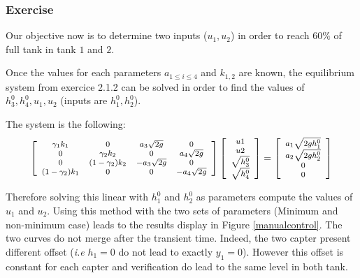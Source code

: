 \subsubsection{Exercise}

Our objective now is to determine two inputs ($u_1, u_2$) in order to reach $60\%$ of full tank in tank $1$ and $2$.

Once the values for each parameters $a_{1 \leq i \leq 4}$ and $k_{1,2}$ are known, the equilibrium system from exercice 2.1.2 can be solved in order to find the values of $h_3^0,h_4^0,u_1,u_2$ (inputs are $h_1^0,h_2^0$).  

The system is the following:
$$
    \footnotesize
\left[
    \begin{array}{cccc}
        \gamma_1 k_1 & 0 & a_3 \sqrt{2g} & 0 \\
        0 & \gamma_2 k_2 & 0 & a_4 \sqrt{2g} \\
        0 & (1-\gamma_2) k_2 & -a_3 \sqrt{2g} & 0 \\
        (1-\gamma_2) k_1 & 0 & 0 & -a_4 \sqrt{2g} \\
    \end{array}
\right]
\left[
    \begin{array}{c}
        u1 \\ u2 \\ \sqrt{h_3^0} \\ \sqrt{h_4^0}
    \end{array}
\right]
=
\left[
    \begin{array}{c}
        a_1 \sqrt{2gh_1^0} \\
        a_2 \sqrt{2gh_2^0} \\
        0 \\
        0 \\
    \end{array}
\right]
$$

Therefore solving this linear with $h_1^0$ and $h_2^0$ as parameters compute the values of $u_1$ and $u_2$. 
Using this method with the two sets of parameters (Minimum and non-minimum case) leads to the results display in Figure \ref{manualcontrol}.
The two curves do not merge after the transient time. Indeed, the two capter present different offset (\emph{i.e} $h_1 = 0$ do not lead to exactly $y_1 = 0$).
However this offset is constant for each capter and verification do lead to the same level in both tank.

